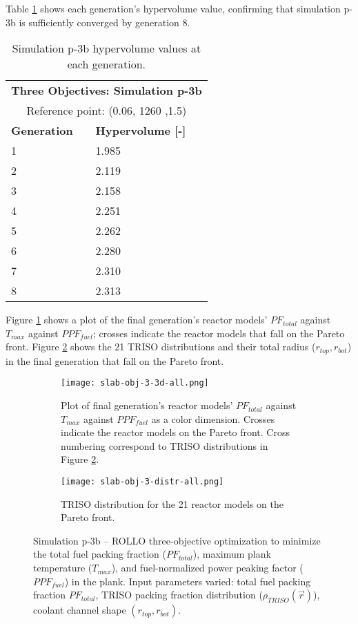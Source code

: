 Table \ref{tab:p3b-hypervolume} shows each generation's hypervolume value, 
confirming that simulation p-3b is sufficiently converged by generation 8. 
\begin{table}[htbp!]
    \centering
    \onehalfspacing
    \caption{Simulation p-3b hypervolume values at each generation.}
	\label{tab:p3b-hypervolume}
    \footnotesize
    \begin{tabular}{ll}
    \hline 
    \multicolumn{2}{c}{\textbf{Three Objectives: Simulation p-3b}} \\
    \multicolumn{2}{c}{Reference point: (0.06, 1260 ,1.5)} \\
    \hline 
    \textbf{Generation} & \textbf{Hypervolume [-]} \\
    \hline
    1 & 1.985 \\
    2 & 2.119 \\
    3 & 2.158 \\
    4 & 2.251\\
    5 & 2.262 \\
    6 & 2.280 \\
    7 & 2.310 \\
    8 & 2.313 \\
    \hline
    \end{tabular}
\end{table}

Figure \ref{fig:slab-obj-3-3d-all} shows a plot of the final generation's reactor 
models' $PF_{total}$ against $T_{max}$ against $PPF_{fuel}$; 
crosses indicate the reactor models that fall on the Pareto front.
Figure \ref{fig:slab-obj-3-distr-all} shows the 21 TRISO distributions and their
total radius ($r_{top}, r_{bot}$) in the final generation that fall on the Pareto 
front. 
\begin{figure}[htbp!]
    \begin{subfigure}{\textwidth}
        \centering
        \texttt{[image: slab-obj-3-3d-all.png]}
        \caption{Plot of final generation's reactor models' $PF_{total}$ against 
        $T_{max}$ against $PPF_{fuel}$ as a color dimension. 
        Crosses indicate the reactor models on the 
        Pareto front. Cross numbering correspond to TRISO distributions in Figure 
        \ref{fig:slab-obj-3-distr-all}.}
        \label{fig:slab-obj-3-3d-all} 
    \end{subfigure}
    \begin{subfigure}{\textwidth}
        \texttt{[image: slab-obj-3-distr-all.png]}
        \caption{TRISO distribution for the 21 reactor models on the Pareto front.}
        \label{fig:slab-obj-3-distr-all} 
    \end{subfigure}
    \caption{Simulation p-3b -- ROLLO three-objective optimization to minimize the total 
    fuel packing fraction ($PF_{total}$), maximum plank temperature ($T_{max}$), and 
    fuel-normalized power peaking factor ($PPF_{fuel}$) in the plank. 
    Input parameters varied: total fuel packing fraction $PF_{total}$, 
    TRISO packing fraction distribution ($\rho_{TRISO}(\vec{r})$), 
    coolant channel shape $(r_{top}, r_{bot})$.}
    \label{fig:slab-obj-3-all}
\end{figure}

